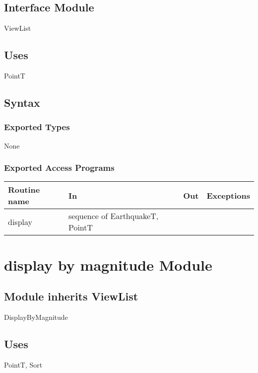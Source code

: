 \documentclass[12pt]{article}
\begin{document}
\subsection* {Interface Module}

ViewList

\subsection* {Uses}

PointT

\subsection* {Syntax}

\subsubsection* {Exported Types}

None

\subsubsection* {Exported Access Programs}

\begin{tabular}{| l | l | l | p{6cm} |}
\hline
\textbf{Routine name} & \textbf{In} & \textbf{Out} & \textbf{Exceptions}\\
\hline
display & sequence of EarthquakeT, PointT &  &  ~\\
\hline
\end{tabular}




\newpage

\section* {display by magnitude Module}

\subsection* {Module inherits ViewList}

DisplayByMagnitude

\subsection* {Uses}

PointT, Sort
\end{document}
